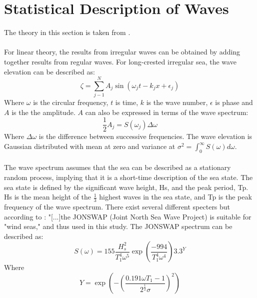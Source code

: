 \section{Statistical Description of Waves} 
 The theory in this section is taken from \cite{Faltinsen1990}.\\\\ For linear theory, the results from irregular waves can be obtained by adding together results from regular waves. For long-crested irregular sea, the wave elevation can be described as:
\begin{equation}
    \zeta = \sum_{j-1}^N A_j \sin(\omega_jt-k_jx+\epsilon_j)
    \label{eq:elevation}
\end{equation}
Where $\omega$ is the circular frequency, $t$ is time, $k$ is the wave number, $\epsilon$ is phase and $A$ is the the amplitude. $A$ can also be expressed in terms of the wave spectrum:
\begin{equation}
    \frac{1}{2}A_j=S(\omega_j) \Delta \omega
\end{equation}
Where $\Delta \omega$ is the difference between successive frequencies. The wave elevation is Gaussian distributed with mean at zero and variance at $\sigma^2= \int_0 ^ \infty S(\omega) d\omega $.\\\\ The wave spectrum assumes that the sea can be described as a stationary random process, implying that it is a short-time description of the sea state. The sea state is defined by the significant wave height, Hs, and the peak period, Tp. Hs is the mean height of the $\frac{1}{3}$ highest waves in the sea state, and Tp is the peak frequency of the wave spectrum. There exist several different specters but according to \cite{Lifes50+D1.1}: "[...]the JONSWAP (Joint North Sea Wave Project) is suitable for "wind seas," and thus used in this study. The JONSWAP spectrum can be described as:
\begin{equation}
    S(\omega)=155 \frac{H_s^2}{T_1^4 \omega ^5} \exp{(\frac{-994}{T_1^4 \omega ^4})} 3.3^Y
\end{equation}
Where
\begin{equation}
    Y= \exp \left(-\left( \frac{0.191 \omega T_1 -1}{2^\frac{1}{2} \sigma} \right)^2\right)
\end{equation}

